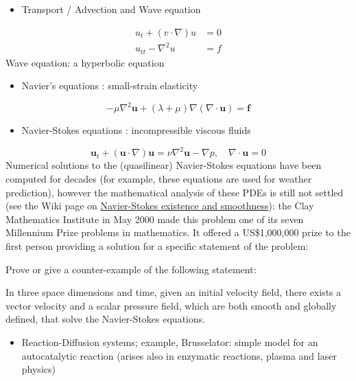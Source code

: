 \documentclass[12pt,landscape]{article}
\begin{document}
{\begin{itemize}
\item Transport / Advection and Wave equation 

\end{itemize}

\begin{align*}
    u_t + (v \cdot \nabla) u &= 0 \\
  u_{tt} - \nabla^2 u &= f 
\end{align*}
Wave equation: a hyperbolic equation

\begin{itemize}
\item Navier's equations : small-strain elasticity 

\end{itemize}
\[
- \mu \nabla^2 \mathbf{u} + (\lambda+\mu) \nabla  (\nabla\cdot\mathbf{u}) = \mathbf{f}
\]
\begin{itemize}
\item Navier-Stokes equations : incompressible viscous fluids 

\end{itemize}
\[
\mathbf{u}_t + (\mathbf{u} \cdot \nabla)\mathbf{u} = \nu \nabla^2 \mathbf{u} - \nabla p, \quad \nabla \cdot \mathbf{u} = 0
\]
Numerical solutions to the (quasilinear) Navier-Stokes equations have been computed for decades (for example, these equations are used for weather prediction), however the mathematical analysis of these PDEs is still not settled (see the Wiki page on \href{https://en.wikipedia.org/wiki/Navier%E2%80%93Stokes_existence_and_smoothness}{Navier-Stokes existence and smoothness}): the Clay Mathematics Institute in May 2000 made this problem one of its seven Millennium Prize problems in mathematics. It offered a US\$1,000,000 prize to the first person providing a solution for a specific statement of the problem:

Prove or give a counter-example of the following statement:

In three space dimensions and time, given an initial velocity field, there exists a vector velocity and a scalar pressure field, which are both smooth and globally defined, that solve the Navier-Stokes equations.

\begin{itemize}
\item Reaction-Diffusion systems; example, Brusselator: simple model for an autocatalytic reaction (arises also in enzymatic reactions, plasma and laser physics)

\end{itemize}

}
\end{document}
